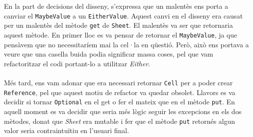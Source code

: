 
	En la part de decisions del disseny, s'expressa que un malentès ens porta a canviar el 
	\texttt{MaybeValue} a un \texttt{EitherValue}. Aquest canvi en el disseny era causat per
	un malentès del mètode \texttt{get} de \texttt{Sheet}. El malentès va ser que retornaria aquest
	mètode. En primer lloc es va pensar de retornar el \texttt{MaybeValue}, ja que pensàvem que 
	no necessitaríem mai la cel·la en qüestió. Però, això ens portava a veure que una casella buida
	podia significar massa coses, pel que vam refactoritzar el codi portant-lo a utilitzar \textit{Either}.
	\\
	\\
	Més tard, ens vam adonar que era necessari retornar \texttt{Cell} per a poder crear \texttt{Reference},
	pel que aquest motiu de refactor va quedar obsolet. Llavors es va decidir si tornar \texttt{Optional}
	 en el get o fer el mateix que en el mètode \texttt{put}. En aquell moment es va decidir que seria més
	 lògic seguir les excepcions en els dos mètodes, donat que \textit{Sheet} era mutable i fer que el mètode
	 \texttt{put} retornés algun valor seria contraintuïtiu en l'usuari final.
